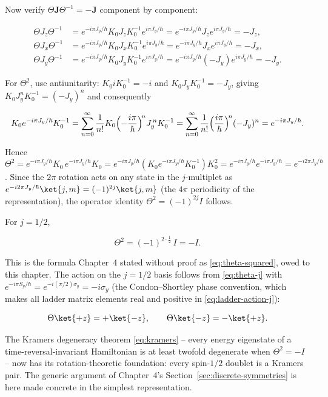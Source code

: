 Now verify $\Theta \bm J \Theta^{-1} = -\bm J$ component by component:
\begin{linenomath}
\begin{align*}
\Theta J_z \Theta^{-1} &= e^{-i\pi J_y/\hbar}K_0 J_z K_0^{-1} e^{i\pi J_y/\hbar}
= e^{-i\pi J_y/\hbar} J_z e^{i\pi J_y/\hbar} = -J_z,\\
\Theta J_x \Theta^{-1} &= e^{-i\pi J_y/\hbar}K_0 J_x K_0^{-1} e^{i\pi J_y/\hbar}
= e^{-i\pi J_y/\hbar} J_x e^{i\pi J_y/\hbar} = -J_x,\\
\Theta J_y \Theta^{-1} &= e^{-i\pi J_y/\hbar}K_0 J_y K_0^{-1} e^{i\pi J_y/\hbar}
= e^{-i\pi J_y/\hbar}(-J_y) e^{i\pi J_y/\hbar} = -J_y.
\end{align*}
\end{linenomath}
For $\Theta^2$, use antiunitarity: $K_0 i K_0^{-1} = -i$ and $K_0 J_y K_0^{-1} = -J_y$, giving $K_0 J_y^n K_0^{-1} = (-J_y)^n$ and consequently
\begin{linenomath}
\begin{equation*}
K_0 e^{-i\pi J_y/\hbar}K_0^{-1}
= \sum_{n=0}^{\infty}\frac{1}{n!}K_0\Bigl(-\frac{i\pi}{\hbar}\Bigr)^{\!n}J_y^{\,n}K_0^{-1}
= \sum_{n=0}^{\infty}\frac{1}{n!}\Bigl(\frac{i\pi}{\hbar}\Bigr)^{\!n}(-J_y)^{n}
= e^{-i\pi J_y/\hbar}.
\end{equation*}
\end{linenomath}
Hence $\Theta^2 = e^{-i\pi J_y/\hbar}K_0\,e^{-i\pi J_y/\hbar}K_0 = e^{-i\pi J_y/\hbar}(K_0 e^{-i\pi J_y/\hbar}K_0^{-1})K_0^2 = e^{-i\pi J_y/\hbar}e^{-i\pi J_y/\hbar} = e^{-i2\pi J_y/\hbar}$. Since the $2\pi$ rotation acts on any state in the $j$-multiplet as $e^{-i2\pi J_y/\hbar}\ket{j,m} = (-1)^{2j}\ket{j,m}$ (the $4\pi$ periodicity of the representation), the operator identity $\Theta^2 = (-1)^{2j}I$ follows.

For $j = 1/2$,
\begin{linenomath}
  \begin{equation}
    \Theta^2 = (-1)^{2\cdot\frac12}\,I = -I.
  \end{equation}
\end{linenomath}
This is the formula Chapter~4 stated without proof as \eqref{eq:theta-squared}, owed to this chapter. The action on the $j=1/2$ basis follows from \eqref{eq:theta-j} with $e^{-i\pi S_y/\hbar} = e^{-i(\pi/2)\sigma_y} = -i\sigma_y$ (the Condon--Shortley phase convention, which makes all ladder matrix elements real and positive in \eqref{eq:ladder-action-j}):
\begin{linenomath}
  \begin{equation}
    \Theta\ket{+z} = +\ket{-z}, \qquad
    \Theta\ket{-z} = -\ket{+z}.
  \end{equation}
\end{linenomath}
The Kramers degeneracy theorem \eqref{eq:kramers} -- every energy eigenstate of a time-reversal-invariant Hamiltonian is at least twofold degenerate when $\Theta^2 = -I$ -- now has its rotation-theoretic foundation: every spin-$1/2$ doublet is a Kramers pair. The generic argument of Chapter~4's Section~\ref{sec:discrete-symmetries} is here made concrete in the simplest representation.

